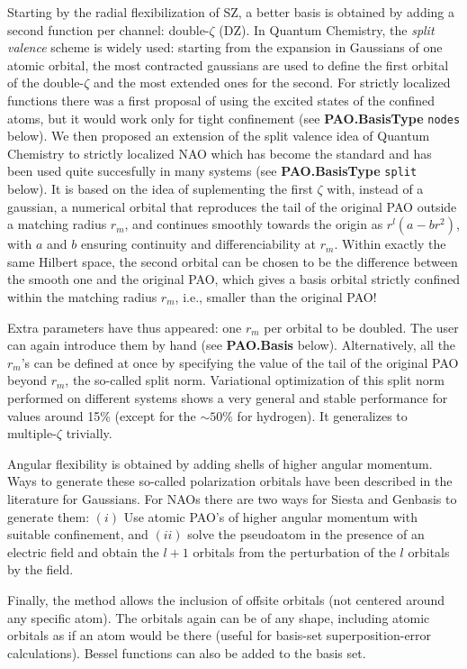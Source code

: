 \documentclass[11pt]{article}
\begin{document}
  Starting by the radial flexibilization of SZ, a better basis is obtained 
by adding a second function per channel: double-$\zeta$ (DZ).
  In Quantum Chemistry, the {\it split valence} scheme
is widely used: starting from the expansion in Gaussians of one atomic 
orbital, the most contracted gaussians are used to define the first
orbital of the double-$\zeta$ and the most extended ones for the second.
  For strictly localized functions there was a first proposal
 of using the excited states of the confined atoms, but it would work only 
for tight confinement (see {\bf PAO.BasisType} {\tt nodes} below).
  We then proposed an extension of the split valence idea of Quantum Chemistry 
to strictly localized NAO which has become the standard and has been used
quite succesfully in many systems (see {\bf PAO.BasisType} {\tt split} below).
  It is based on the idea of suplementing the first $\zeta$ with, instead of
a gaussian, a numerical orbital that reproduces the tail of the original PAO 
outside a matching radius $r_{m}$, and continues smoothly towards the origin as 
$r^l(a-br^2)$, with $a$ and $b$ ensuring continuity and differenciability 
at $r_{m}$. 
  Within exactly the same
Hilbert space, the second orbital can be chosen to be the difference between
the smooth one and the original PAO, which gives a basis orbital strictly
confined within the matching radius $r_{m}$, i.e., smaller than the
original PAO! 

  Extra parameters have thus appeared: one $r_m$ per orbital to be doubled. 
The user can again introduce them by hand (see {\bf PAO.Basis} below).
Alternatively, all the $r_m$'s can be defined at once by specifying
the value of the tail of the original PAO beyond $r_m$, the so-called
split norm. Variational optimization
of this split norm performed on different systems
shows a very general and stable performance for values around
15\% (except for the $\sim 50\%$ for hydrogen). 
  It generalizes to multiple-$\zeta$ trivially.

  Angular flexibility is obtained by adding shells of higher angular 
momentum.
  Ways to generate these so-called polarization orbitals have been
described in the literature for Gaussians. 
  For NAOs there are two ways for {\sc Siesta} and {\sc Genbasis} to
generate them: $(i)$ Use atomic PAO's of higher angular momentum with
suitable confinement, and $(ii)$ solve the pseudoatom in the presence
of an electric field and obtain the $l+1$ orbitals from the perturbation
of the $l$ orbitals by the field.

  Finally, the method allows the inclusion of offsite orbitals (not centered
around any specific atom). The orbitals again can be of any shape, including
atomic orbitals as if an atom would be there (useful for basis-set
superposition-error calculations). Bessel functions can also be added
to the basis set.
\end{document}
